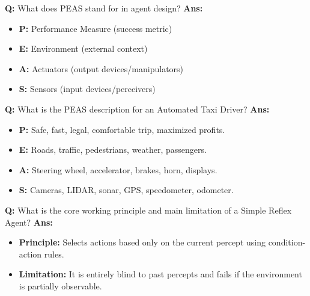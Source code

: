 \documentclass[10pt,a4paper,twocolumn]{article}
\begin{document}
\begin{tcolorbox}[
  colback=white,
  colframe=UnitColorTwo,
  colbacktitle=gray!10!white,
  coltitle=black,
  fonttitle=\bfseries\sffamily\small,
  title={Unit II $\bullet$ Card 2: PEAS framework},
  boxrule=1.2pt,
  arc=2mm,
  outer arc=2mm,
  boxsep=1.5mm,
  top=1mm,
  bottom=1mm,
  left=1.5mm,
  right=1.5mm,
  before skip=2.5mm,
  after skip=2.5mm
]
\textbf{Q:} What does PEAS stand for in agent design?
\tcbline
\textbf{Ans:} \begin{itemize}
  \item   \textbf{P:} Performance Measure (success metric)
  \item   \textbf{E:} Environment (external context)
  \item   \textbf{A:} Actuators (output devices/manipulators)
  \item   \textbf{S:} Sensors (input devices/perceivers)
\end{itemize}
\end{tcolorbox}


\begin{tcolorbox}[
  colback=white,
  colframe=UnitColorTwo,
  colbacktitle=gray!10!white,
  coltitle=black,
  fonttitle=\bfseries\sffamily\small,
  title={Unit II $\bullet$ Card 3: Automated Taxi PEAS},
  boxrule=1.2pt,
  arc=2mm,
  outer arc=2mm,
  boxsep=1.5mm,
  top=1mm,
  bottom=1mm,
  left=1.5mm,
  right=1.5mm,
  before skip=2.5mm,
  after skip=2.5mm
]
\textbf{Q:} What is the PEAS description for an Automated Taxi Driver?
\tcbline
\textbf{Ans:} \begin{itemize}
  \item   \textbf{P:} Safe, fast, legal, comfortable trip, maximized profits.
  \item   \textbf{E:} Roads, traffic, pedestrians, weather, passengers.
  \item   \textbf{A:} Steering wheel, accelerator, brakes, horn, displays.
  \item   \textbf{S:} Cameras, LIDAR, sonar, GPS, speedometer, odometer.
\end{itemize}
\end{tcolorbox}


\begin{tcolorbox}[
  colback=white,
  colframe=UnitColorTwo,
  colbacktitle=gray!10!white,
  coltitle=black,
  fonttitle=\bfseries\sffamily\small,
  title={Unit II $\bullet$ Card 4: Simple Reflex Agent},
  boxrule=1.2pt,
  arc=2mm,
  outer arc=2mm,
  boxsep=1.5mm,
  top=1mm,
  bottom=1mm,
  left=1.5mm,
  right=1.5mm,
  before skip=2.5mm,
  after skip=2.5mm
]
\textbf{Q:} What is the core working principle and main limitation of a Simple Reflex Agent?
\tcbline
\textbf{Ans:} \begin{itemize}
  \item   \textbf{Principle:} Selects actions based only on the current percept using condition-action rules.
  \item   \textbf{Limitation:} It is entirely blind to past percepts and fails if the environment is partially observable.
\end{itemize}
\end{tcolorbox}
\end{document}
